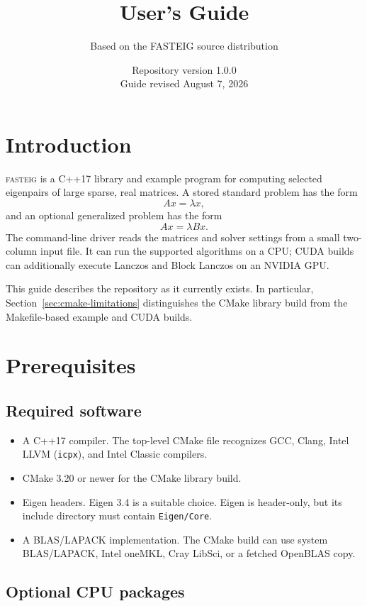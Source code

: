 \documentclass[11pt]{article}
\title{\fasteig{} User's Guide}
\author{Based on the FASTEIG source distribution}
\date{Repository version 1.0.0\\Guide revised August 7, 2026}
\newcommand{\fasteig}{\textsc{fasteig}}
\newcommand{\code}[1]{\texttt{#1}}
\begin{document}
\setlength{\emergencystretch}{3em}
\maketitle
\tableofcontents
\newpage

\section{Introduction}

\fasteig{} is a C++17 library and example program for computing selected
eigenpairs of large sparse, real matrices.  A stored standard problem has the
form
\[
    A x = \lambda x,
\]
and an optional generalized problem has the form
\[
    A x = \lambda B x.
\]
The command-line driver reads the matrices and solver settings from a small
two-column input file.  It can run the supported algorithms on a CPU; CUDA
builds can additionally execute Lanczos and Block Lanczos on an NVIDIA GPU.

This guide describes the repository as it currently exists.  In particular,
Section~\ref{sec:cmake-limitations} distinguishes the CMake library build from
the Makefile-based example and CUDA builds.

\section{Prerequisites}

\subsection{Required software}

\begin{itemize}[leftmargin=*]
  \item A C++17 compiler.  The top-level CMake file recognizes GCC, Clang,
        Intel LLVM (\code{icpx}), and Intel Classic compilers.
  \item CMake 3.20 or newer for the CMake library build.
  \item Eigen headers.  Eigen 3.4 is a suitable choice.  Eigen is header-only,
        but its include directory must contain \code{Eigen/Core}.
  \item A BLAS/LAPACK implementation.  The CMake build can use system
        BLAS/LAPACK, Intel oneMKL, Cray LibSci, or a fetched OpenBLAS copy.
\end{itemize}

\subsection{Optional CPU packages}
\end{document}
